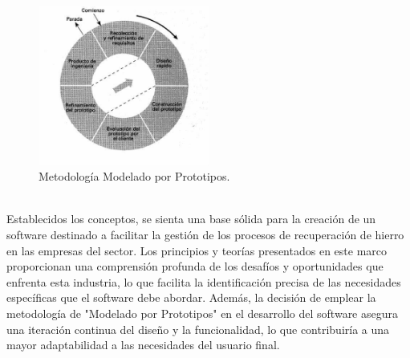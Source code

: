 \documentclass[12pt,onehalfspacing]{report}
\begin{document}
\begin{figure}[h]
  \centering
  \includegraphics[width=0.5\textwidth]{PrototipadoImg}
  \caption{Metodología Modelado por Prototipos. \cite{modelo_prototipos}}
  \label{fig:prototipado}
\end{figure}\\
Establecidos los conceptos, se sienta una base sólida para la creación de un software destinado a facilitar la gestión de los procesos de recuperación de hierro en las empresas del sector. Los principios y teorías presentados en este marco proporcionan una comprensión profunda de los desafíos y oportunidades que enfrenta esta industria, lo que facilita la identificación precisa de las necesidades específicas que el software debe abordar. Además, la decisión de emplear la metodología de "Modelado por Prototipos" en el desarrollo del software asegura una iteración continua del diseño y la funcionalidad, lo que contribuiría a una mayor adaptabilidad a las necesidades del usuario final.




\end{document}

